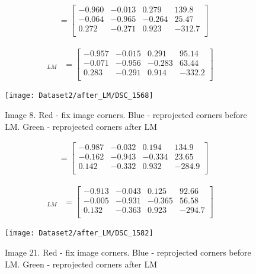 \documentclass[11pt]{article}
\begin{document}
\begin{align*}
[\mathbf{R}|t] &= \begin{bmatrix} 
-0.960 & -0.013 & 0.279 & 139.8 \\
-0.064 & -0.965 & -0.264 & 25.47 \\
0.272 & -0.271 & 0.923 & -312.7\\
\end{bmatrix}
\end{align*}

\begin{align*}
[\mathbf{R}|t]_{LM} &= \begin{bmatrix} 
-0.957 & -0.015 & 0.291 & 95.14 \\
-0.071 & -0.956 & -0.283 & 63.44 \\
0.283 & -0.291 & 0.914 & -332.2\\
\end{bmatrix}
\end{align*}

\begin{figure}[H]
\centering
\texttt{[image: Dataset2/after\_LM/DSC\_1568]}
\caption{Image 8. Red - fix image corners. Blue - reprojected corners before LM. Green - reprojected corners after LM}
\label{}
\end{figure}

\begin{align*}
[\mathbf{R}|t] &= \begin{bmatrix} 
-0.987 & -0.032 & 0.194 & 134.9 \\
-0.162 & -0.943 & -0.334 & 23.65 \\
0.142 & -0.332 & 0.932 & -284.9\\
\end{bmatrix}
\end{align*}

\begin{align*}
[\mathbf{R}|t]_{LM} &= \begin{bmatrix} 
-0.913 & -0.043 & 0.125 & 92.66 \\
-0.005 & -0.931 & -0.365 & 56.58 \\
0.132 & -0.363 & 0.923 & -294.7\\
\end{bmatrix}
\end{align*}

\begin{figure}[H]
\centering
\texttt{[image: Dataset2/after\_LM/DSC\_1582]}
\caption{Image 21. Red - fix image corners. Blue - reprojected corners before LM. Green - reprojected corners after LM}
\label{}
\end{figure}
\end{document}
